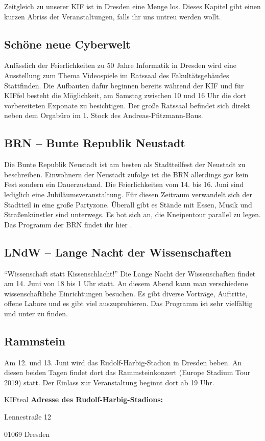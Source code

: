 Zeitgleich zu unserer KIF ist in Dresden eine Menge los. Dieses Kapitel gibt einen kurzen Abriss der Veranstaltungen, falls ihr uns untreu werden wollt.

\subsection*{Schöne neue Cyberwelt}
Anlässlich der Feierlichkeiten zu 50 Jahre Informatik in Dresden wird eine Ausstellung zum Thema Videospiele im Ratssaal des Fakultätsgebäudes Stattfinden.
Die Aufbauten dafür beginnen bereits während der KIF und für KIFfel besteht die Möglichkeit, am Samstag zwischen 10 und 16 Uhr die dort vorbereiteten Exponate zu besichtigen.
Der große Ratssaal befindet sich direkt neben dem Orgabüro im 1. Stock des Andreas-Pfitzmann-Baus.


\subsection*{BRN -- Bunte Republik Neustadt}
Die Bunte Republik Neustadt ist am besten als Stadtteilfest der Neustadt zu beschreiben.
Einwohnern der Neustadt zufolge ist die BRN allerdings gar kein Fest sondern ein Dauerzustand.
Die Feierlichkeiten vom 14. bis 16. Juni sind lediglich eine Jubiläumsveranstaltung.
Für diesen Zeitraum verwandelt sich der Stadtteil in eine große Partyzone.
Überall gibt es Stände mit Essen, Musik und Straßenkünstler sind unterwegs.
Es bot sich an, die Kneipentour parallel zu legen.
Das Programm der BRN findet ihr hier .

\subsection*{LNdW -- Lange Nacht der Wissenschaften}
\enquote{Wissenschaft statt Kissenschlacht!}
Die Lange Nacht der Wissenschaften findet am 14. Juni von 18 bis 1 Uhr statt.
An diesem Abend kann man verschiedene wissenschaftliche Einrichtungen besuchen.
Es gibt diverse Vorträge, Auftritte, offene Labore und es gibt viel auszuprobieren.
Das Programm ist sehr vielfältig und unter  zu finden.

\subsection*{Rammstein}
Am 12. und 13. Juni wird das Rudolf-Harbig-Stadion in Dresden beben.
An diesen beiden Tagen findet dort das Rammsteinkonzert (Europe Stadium Tour 2019) statt.
Der Einlass zur Veranstaltung beginnt dort ab 19 Uhr.

\begin{awesomeblock}[KIFteal]{2pt}{\faQuestion}{KIFteal}
    \textbf{Adresse des Rudolf-Harbig-Stadions:}

    Lennestraße 12

    01069 Dresden
\end{awesomeblock}

